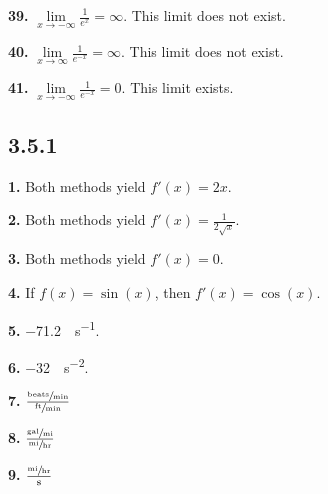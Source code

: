 \documentclass[12pt,]{book}
\theoremstyle{plain}
\theoremstyle{definition}
\numberwithin{equation}{section}
\newcommand{\fe}[2]{#1\mathopen{}\left(#2\right)\mathclose{}}
\newcommand{\fd}[1]{#1'}
\begin{document}
                \par\smallskip
\noindent\textbf{39.}\quad{}
                    \(\lim\limits_{x\to-\infty}\frac{1}{e^x}=\infty\). This limit does not exist.%

                \par\smallskip
\noindent\textbf{40.}\quad{}
                    \(\lim\limits_{x\to\infty}\frac{1}{e^{-x}}=\infty\). This limit does not exist.%

                \par\smallskip
\noindent\textbf{41.}\quad{}
                    \(\lim\limits_{x\to-\infty}\frac{1}{e^{-x}}=0\). This limit exists.%

                \par\smallskip
\subsection*{3.5.1 }
\noindent\textbf{1.}\quad{}
                    Both methods yield \(\fe{\fd{f}}{x}=2x\).%

                \par\smallskip
\noindent\textbf{2.}\quad{}
                    Both methods yield \(\fe{\fd{f}}{x}=\frac{1}{2\sqrt{x}}\).%

                \par\smallskip
\noindent\textbf{3.}\quad{}
                    Both methods yield \(\fe{\fd{f}}{x}=0\).%

                \par\smallskip
\noindent\textbf{4.}\quad{}
                If \(\fe{f}{x}=\fe{\sin}{x}\), then \(\fe{\fd{f}}{x}=\fe{\cos}{x}\).%

            \par\smallskip
\noindent\textbf{5.}\quad{}
                    \SI{-71.2}{\foot\per\second}.%

                \par\smallskip
\noindent\textbf{6.}\quad{}
                    \SI{-32}{\foot\per\second\tothe{2}}.%

                \par\smallskip
\noindent\textbf{7.}\quad{}
                    \(\frac{\sfrac{\text{beats}}{\text{min}}}{\sfrac{\text{ft}}{\text{min}}}\)%

                \par\smallskip
\noindent\textbf{8.}\quad{}
                    \(\frac{\sfrac{\text{gal}}{\text{mi}}}{\sfrac{\text{mi}}{\text{hr}}}\)%

                \par\smallskip
\noindent\textbf{9.}\quad{}
                    \(\frac{\sfrac{\text{mi}}{\text{hr}}}{\text{s}}\)%
\end{document}
